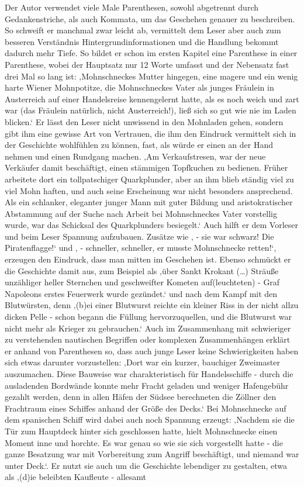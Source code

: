 Der Autor verwendet viele Male Parenthesen, sowohl abgetrennt durch Gedankenstriche, als auch Kommata, um das Geschehen genauer zu beschreiben. So schweift er manchmal zwar leicht ab, vermittelt dem Leser aber auch zum besseren Verständnis Hintergrundinformationen und die Handlung bekommt dadurch mehr Tiefe. So bildet er schon im ersten Kapitel eine Parenthese in einer Parenthese, wobei der Hauptsatz nur 12 Worte umfasst und der Nebensatz fast drei Mal so lang ist:\cite[S.13]{pir} ‚Mohnschneckes Mutter hingegen, eine magere und ein wenig harte Wiener Mohnpotitze, die Mohnschneckes Vater als junges Fräulein in Austerreich  auf einer Handelsreise kennengelernt hatte, als es noch weich und zart war (das Fräulein natürlich, nicht Austerreich!), ließ sich so gut wie nie im Laden blicken.‘\cite[S.13]{pir} Er lässt  den Leser nicht unwissend in den Mohnladen gehen, sondern gibt ihm eine gewisse Art von Vertrauen, die ihm den Eindruck vermittelt sich in der Geschichte wohlfühlen zu können, fast, als würde er einen an der Hand nehmen und einen Rundgang machen. ‚Am Verkaufstresen, war der neue Verkäufer damit beschäftigt, einen stämmigen Topfkuchen zu bedienen. Früher arbeitete dort ein tollpatschiger Quarkplunder, aber an ihm blieb ständig viel zu viel Mohn haften, und auch seine Erscheinung war nicht besonders ansprechend. Als ein schlanker, eleganter junger Mann mit guter Bildung und aristokratischer Abstammung auf der Suche nach Arbeit bei Mohnschneckes Vater vorstellig wurde, war das Schicksal des Quarkplunders besiegelt.‘\cite[S.15]{pir} Auch hilft er dem Vorleser und beim Leser Spannung aufzubauen. Zusätze wie ‚ - sie war schwarz! Die Piratenflagge!‘\cite[S.28]{pir} und ‚ - schneller, schneller, er musste Mohnschnecke retten!‘,\cite[S.29]{pir} erzeugen den Eindruck, dass man mitten im Geschehen ist. Ebenso schmückt er die Geschichte damit aus, zum Beispiel als ‚über Sankt Krokant (…) Sträuße unzähliger heller Sternchen und geschweifter Kometen auf(leuchteten) - Graf Napoleons erstes Feuerwerk wurde gezündet.‘\cite[S.36]{pir} und nach dem Kampf mit den Blutwürsten, denn ‚(b)ei einer Blutwurst reichte ein kleiner Riss in der nicht allzu dicken Pelle - schon begann die Füllung hervorzuquellen, und die Blutwurst war nicht mehr als Krieger zu gebrauchen.‘ Auch im Zusammenhang mit schwieriger zu verstehenden nautischen Begriffen oder komplexen Zusammenhängen erklärt er anhand von  Parenthesen so, dass auch junge Leser keine Schwierigkeiten haben sich etwas darunter vorzustellen: ‚Dort war ein kurzer, bauchiger Zweimaster auszumachen. Diese Bauweise war charakteristisch für Handelsschiffe - durch die ausladenden Bordwände konnte mehr Fracht geladen und weniger Hafengebühr gezahlt werden, denn in allen Häfen der Südsee berechneten die Zöllner den Frachtraum eines Schiffes anhand der Größe des Decks.‘\cite[S.51]{pir} Bei Mohnschnecke auf  dem spanischen Schiff wird dabei auch noch Spannung erzeugt: ‚Nachdem sie die Tür zum Hauptdeck hinter sich geschlossen hatte, hielt Mohnschnecke einen Moment inne und horchte. Es war genau so wie sie sich vorgestellt hatte - die ganze Besatzung war mit Vorbereitung zum Angriff beschäftigt, und niemand war unter Deck.‘.\cite[S.257]{pir} Er nutzt sie auch um die Geschichte lebendiger zu gestalten, etwa als ‚(d)ie beleibten Kaufleute - allesamt 